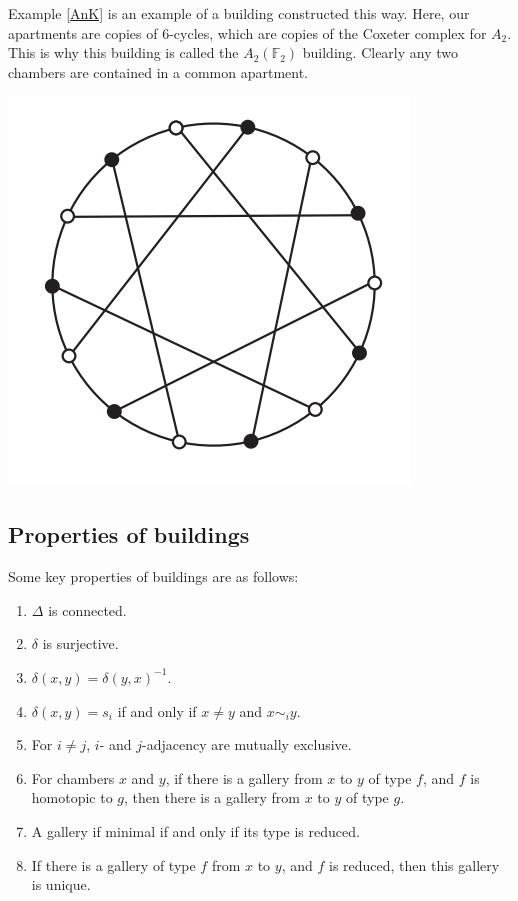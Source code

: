 \documentclass[11pt]{article}
\begin{document}
\begin{example}
    Example \ref{AnK} is an example of a building constructed this way. Here, our apartments are copies of 6-cycles, which are copies of the Coxeter complex for $A_2$. This is why this building is called the $A_2(\mathbb{F}_2)$ building. Clearly any two chambers are contained in a common apartment. 
    \begin{center}
        \includegraphics[scale=0.7]{Screenshot 2023-03-16 131651.png}\\
    \end{center}
\end{example}


\subsection{Properties of buildings}
Some key properties of buildings are as follows:
\begin{enumerate}
    \item $\Delta$ is connected.
    \item $\delta$ is surjective.
    \item $\delta(x,y)=\delta(y,x)^{-1}$.
    \item $\delta(x,y)=s_i$ if and only if $x\neq y$ and $x\sim_i y$.
    \item For $i\neq j$, $i$- and $j$-adjacency are mutually exclusive.
    \item For chambers $x$ and $y$, if there is a gallery from $x$ to $y$ of type $f$, and $f$ is homotopic to $g$, then there is a gallery from $x$ to $y$ of type $g$. 
    \item A gallery if minimal if and only if its type is reduced.
    \item If there is a gallery of type $f$ from $x$ to $y$, and $f$ is reduced, then this gallery is unique.
\end{enumerate}
\end{document}
